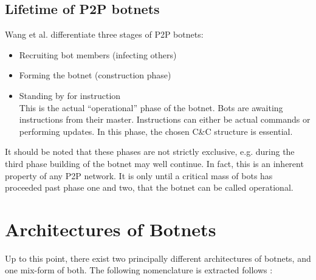 \documentclass{llncs}
\begin{document}
\subsection{Lifetime of P2P botnets}
Wang et al.\cite{wang2009systematic} differentiate three stages of P2P botnets:
\begin{itemize}
\item Recruiting bot members (infecting others)
\item Forming the botnet (construction phase)
\item Standing by for instruction \\
This is the actual ``operational'' phase of the botnet. Bots are awaiting instructions from their master. Instructions can either be actual commands or performing updates. In this phase, the chosen C\&C structure is essential.
\end{itemize}
It should be noted that these phases are not strictly exclusive,
e.g. during the third phase building of the botnet may well
continue. In fact, this is an inherent property of any P2P network. It
is only until a critical mass of bots has proceeded past phase one and
two, that the botnet can be called operational.

\section{Architectures of Botnets}
Up to this point, there exist two principally different architectures
of botnets, and one mix-form of both. The following nomenclature is
extracted follows \cite{steggink2007detection}:
\end{document}
